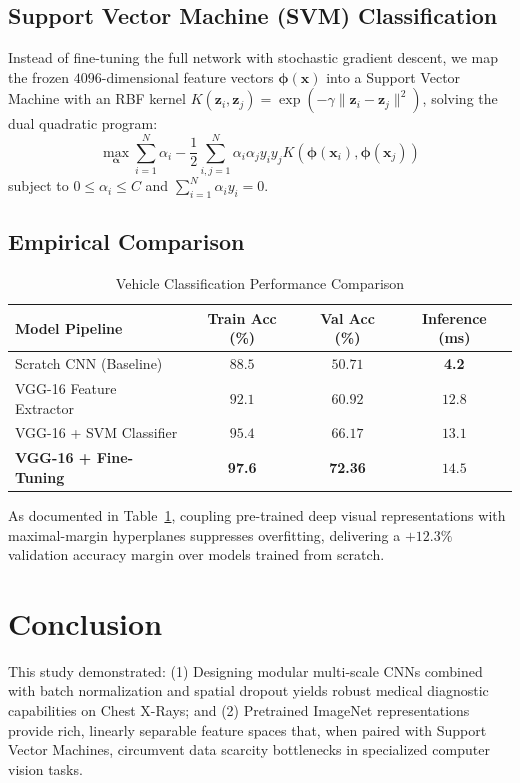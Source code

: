 \documentclass[conference]{IEEEtran}
\begin{document}
\subsection{Support Vector Machine (SVM) Classification}
Instead of fine-tuning the full network with stochastic gradient descent, we map the frozen $4096$-dimensional feature vectors $\mathbf{\phi}(\mathbf{x})$ into a Support Vector Machine with an RBF kernel $K(\mathbf{z}_i, \mathbf{z}_j) = \exp(-\gamma \|\mathbf{z}_i - \mathbf{z}_j\|^2)$, solving the dual quadratic program:
\begin{equation}
\max_{\boldsymbol{\alpha}} \sum_{i=1}^N \alpha_i - \frac{1}{2} \sum_{i,j=1}^N \alpha_i \alpha_j y_i y_j K(\mathbf{\phi}(\mathbf{x}_i), \mathbf{\phi}(\mathbf{x}_j))
\end{equation}
subject to $0 \le \alpha_i \le C$ and $\sum_{i=1}^N \alpha_i y_i = 0$.

\subsection{Empirical Comparison}
\begin{table}[htbp]
\caption{Vehicle Classification Performance Comparison}
\centering
\begin{tabular}{@{}lccc@{}}
\toprule
\textbf{Model Pipeline} & \textbf{Train Acc (\%)} & \textbf{Val Acc (\%)} & \textbf{Inference (ms)} \\
\midrule
Scratch CNN (Baseline) & $88.5$ & $50.71$ & \textbf{4.2} \\
VGG-16 Feature Extractor & $92.1$ & $60.92$ & $12.8$ \\
VGG-16 + SVM Classifier & $95.4$ & $66.17$ & $13.1$ \\
\textbf{VGG-16 + Fine-Tuning} & \textbf{97.6} & \textbf{72.36} & $14.5$ \\
\bottomrule
\end{tabular}
\label{tab:vgg_svm}
\end{table}

As documented in Table~\ref{tab:vgg_svm}, coupling pre-trained deep visual representations with maximal-margin hyperplanes suppresses overfitting, delivering a $+12.3\%$ validation accuracy margin over models trained from scratch.

\section{Conclusion}
This study demonstrated: (1) Designing modular multi-scale CNNs combined with batch normalization and spatial dropout yields robust medical diagnostic capabilities on Chest X-Rays; and (2) Pretrained ImageNet representations provide rich, linearly separable feature spaces that, when paired with Support Vector Machines, circumvent data scarcity bottlenecks in specialized computer vision tasks.
\end{document}
